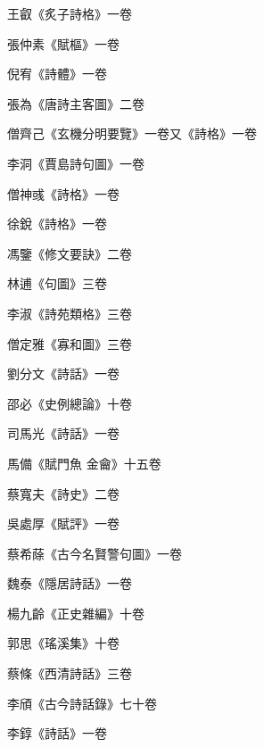 \begin{pinyinscope}
 王叡《炙子詩格》一卷



 張仲素《賦樞》一卷



 倪宥《詩體》一卷



 張為《唐詩主客圖》二卷



 僧齊己《玄機分明要覽》一卷又《詩格》一卷



 李洞《賈島詩句圖》一卷



 僧神彧《詩格》一卷



 徐銳《詩格》一卷



 馮鑒《修文要訣》二卷



 林逋《句圖》三卷



 李淑《詩苑類格》三卷



 僧定雅《寡和圖》三卷



 劉分文《詩話》一卷



 邵必《史例總論》十卷



 司馬光《詩話》一卷



 馬備《賦門魚
 金龠》十五卷



 蔡寬夫《詩史》二卷



 吳處厚《賦評》一卷



 蔡希蒢《古今名賢警句圖》一卷



 魏泰《隱居詩話》一卷



 楊九齡《正史雜編》十卷



 郭思《瑤溪集》十卷



 蔡條《西清詩話》三卷



 李頎《古今詩話錄》七十卷



 李錞《詩話》一卷




\end{pinyinscope}
